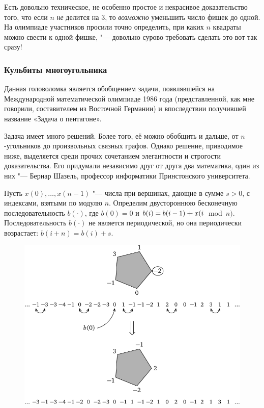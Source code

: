 \documentclass[twoside]{book}
\begin{document}
Есть довольно техническое, не особенно простое и некрасивое 
доказательство того, что если $n$ \emph{не} делится на $3$, то \emph{возможно} уменьшить число фишек до одной.
На олимпиаде участников просили точно определить, при каких $n$ квадраты можно свести к одной фишке, "--- довольно сурово требовать сделать это вот так сразу!

\subsubsection*{Кульбиты многоугольника}%

Данная головоломка является обобщением задачи, появлявшейся на Международной математической олимпиаде 1986 года (представленной, как мне говорили, составителем из Восточной Германии) и впоследствии получившей название «Задача о пентагоне».

Задача имеет много решений.
Более того, её можно обобщить и дальше, от $n$-угольников до произвольных связных графов.
Однако решение, приводимое ниже, выделяется среди прочих сочетанием элегантности и строгости доказательства.
Его придумали независимо друг от друга  два математика, один из них "--- Бернар Шазель, профессор информатики Принстонского университета. %


Пусть $x(0),\dots,x(n-1)$ "--- числа при вершинах, дающие в сумме $s > 0$, с индексами, взятыми по модулю $n$.
Определим двустороннюю бесконечную последовательность
$b(\cdot)$, где $b(0) = 0$ и $b(i) = b(i -1) \hm+ x(i$~mod~${n})$.
Последовательность $b(\cdot)$ не является периодической, но она периодически возрастает: $b(i + n) = b(i) + s$.

\begin{figure}
\centering
\includegraphics{mp/wink-200}
\end{figure}
\end{document}
